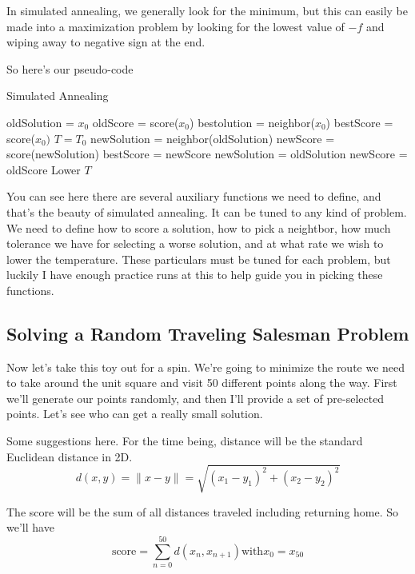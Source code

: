 \documentclass{article}
\theoremstyle{definition}
\theoremstyle{remark}
\begin{document}
In simulated annealing, we generally look for the minimum, but this can easily be made into a maximization problem by looking for the lowest value of $-f$ and wiping away to negative sign at the end.


So here's our pseudo-code
\begin{algorithm}
	\caption{Simulated Annealing}
	\label{SA}
	\begin{algorithmic}[1]
		\State oldSolution = $x_0$
		\State oldScore = score($x_0$)
		\State bestolution = neighbor($x_0$)
		\State bestScore = score($x_0)$
		\State $T = T_0$
		\State newSolution = neighbor(oldSolution)
		\State newScore = score(newSolution)
	    \State bestScore = newScore
	    \EndIf
	    \State newSolution = oldSolution
	    \State newScore = oldScore
	    \EndIf
	    \EndFor
	    \State Lower $T$
	    \EndWhile
		\EndProcedure
	\end{algorithmic}	
\end{algorithm}   


You can see here there are several auxiliary functions we need to define, and that's the beauty of simulated annealing.  It can be tuned to any kind of problem.  We need to define how to score a solution, how to pick a neightbor, how much tolerance we have for selecting a worse solution, and at what rate we wish to lower the temperature.  These particulars must be tuned for each problem, but luckily I have enough practice runs at this to help guide you in picking these functions.


\subsection{Solving a Random Traveling Salesman Problem}

Now let's take this toy out for a spin.  We're going to minimize the route we need to take around the unit square and visit 50 different points along the way.  First we'll generate our points randomly, and then I'll provide a set of pre-selected points.  Let's see who can get a really small solution.

Some suggestions here. For the time being, distance will be the standard Euclidean distance in 2D.
\[
d(x,y) = \|x-y\| = \sqrt{(x_1-y_1)^2 + (x_2-y_2)^2}
\]

The score will be the sum of all distances traveled including returning home.
So we'll have
\[
 \text{score} = \sum_{n=0}^{50} d(x_n,x_{n+1}) \text{with} x_0 = x_{50}
\]
\end{document}
